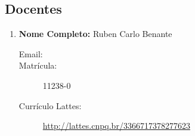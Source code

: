 \documentclass[a4paper,12pt]{article} %
\begin{document}
\subsection*{Docentes}

\begin{enumerate}
    \item \textbf{Nome Completo:} Ruben Carlo Benante
    \begin{description}
        \item [Email:] 
        \item [Matrícula:] 11238-0
        \item [Currículo Lattes:] \url{http://lattes.cnpq.br/3366717378277623}
    \end{description}
\end{enumerate}



\nocite{*}



% 



\end{document}
